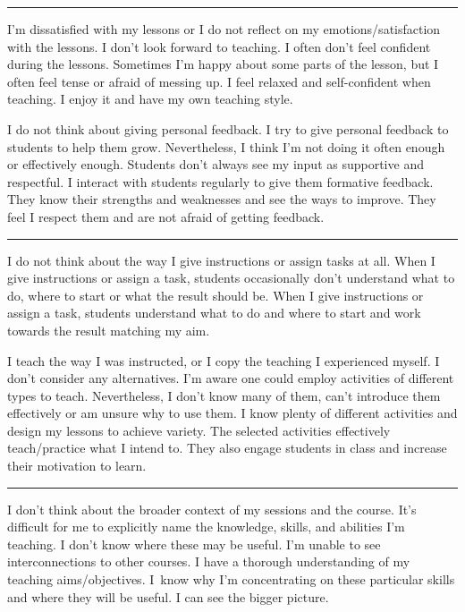 \rule{\textwidth}{0.4pt}
{I'm dissatisfied with my lessons or I do not reflect on my emotions/satisfaction with the lessons. I don't look forward to teaching.}
{I often don't feel confident during the lessons. Sometimes I'm happy about some parts of the lesson, but I often feel tense or afraid of messing up.}
{I feel relaxed and self-confident when teaching. I enjoy it and have my own teaching style.}

\newpage
{}
{I do not think about giving personal feedback.}
{I try to give personal feedback to students to help them grow. Nevertheless, I think I'm not doing it often enough or effectively enough. Students don't always see my input as supportive and respectful.}
{I interact with students regularly to give them formative feedback. They know their strengths and weaknesses and see the ways to improve. They feel I respect them and are not afraid of getting feedback.}

\rule{\textwidth}{0.4pt}
{I do not think about the way I give instructions or assign tasks at all.}
{When I give instructions or assign a task, students occasionally don't understand what to do, where to start or what the result should be.}
{When I give instructions or assign a task, students understand what to do and where to start and work towards the result matching my aim.}

\newpage
{}
{I teach the way I was instructed, or I copy the teaching I experienced myself. I don't consider any alternatives.}
{I'm aware one could employ activities of different types to teach. Nevertheless, I don't know many of them, can't introduce them effectively or am unsure why to use them.}
{I know plenty of different activities and design my lessons to achieve variety. The selected activities effectively teach/practice what I intend to. They also engage students in class and increase their motivation to learn.}

\rule{\textwidth}{0.4pt}
{I don't think about the broader context of my sessions and the course.}
{It's difficult for me to explicitly name the knowledge, skills, and abilities I'm teaching. I don't know where these may be useful. I'm unable to see interconnections to other courses.}
{I have a thorough understanding of my teaching aims/objectives. I~know why I'm concentrating on these particular skills and where they will be useful. I can see the bigger picture.}
\vspace*{-1em}


